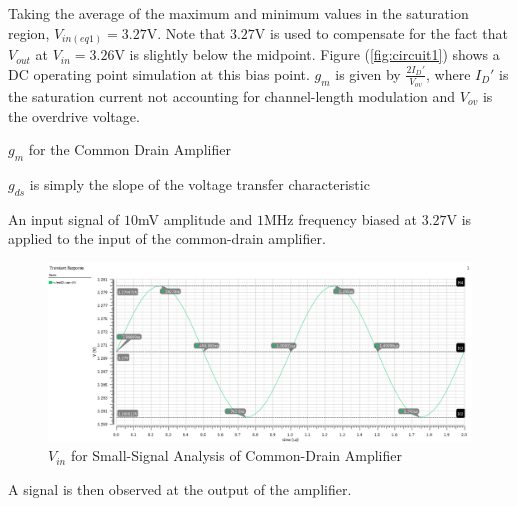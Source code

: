 Taking the average of the maximum and minimum values in the saturation region, $V_{in(eq1)} = 3.27$\si{\volt}.
Note that $3.27$\si{\volt} is used to compensate for the fact that $V_{out}$ at $V_{in} = 3.26$\si{\volt} is slightly below the midpoint.
Figure (\ref{fig:circuit1}) shows a DC operating point simulation at this bias point.
$g_{m}$ is given by $\frac{2I_{D}'}{V_{ov}}$, where $I_{D}'$ is the saturation current not accounting for channel-length modulation and $V_{ov}$ is the overdrive voltage.

\FloatBarrier

\begin{table}[h!]
	\centering
	\caption{$g_{m}$ for the Common Drain Amplifier}
	\label{tab:common_drain_amp_gm}
\end{table}

\FloatBarrier

$g_{ds}$ is simply the slope of the voltage transfer characteristic


An input signal of $10$\si{\milli\volt} amplitude and $1$\si{\mega\hertz} frequency biased at $3.27$\si{\volt} is applied to the input of the common-drain amplifier.

\FloatBarrier

\begin{figure}[h!]
	\centering
	\includegraphics[scale=0.75]{../images/sim1_vin.PNG}
	\caption{$V_{in}$ for Small-Signal Analysis of Common-Drain Amplifier}
	\label{fig:sim1_vin}
\end{figure}

\FloatBarrier

A signal is then observed at the output of the amplifier.

